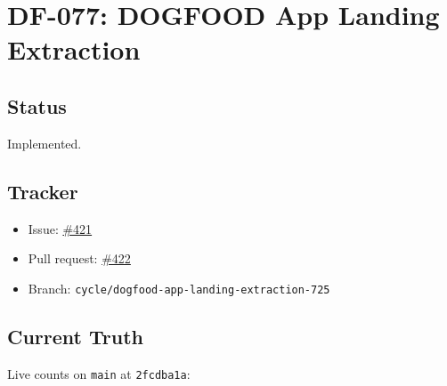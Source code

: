 \chapter{DF-077: DOGFOOD App Landing Extraction}\label{record-117}

\smallskip

\section{Status}\label{record-117-status}

Implemented.

\section{Tracker}\label{record-117-tracker}

\begin{itemize}
\tightlist
\item
  Issue: \href{https://github.com/flyingrobots/bijou/issues/421}{\#421}
\item
  Pull request: \href{https://github.com/flyingrobots/bijou/pull/422}{\#422}
\item
  Branch: \texttt{c\allowbreak{}y\allowbreak{}c\allowbreak{}l\allowbreak{}e\allowbreak{}/\allowbreak{}d\allowbreak{}o\allowbreak{}g\allowbreak{}f\allowbreak{}o\allowbreak{}o\allowbreak{}d\allowbreak{}-\allowbreak{}a\allowbreak{}p\allowbreak{}p\allowbreak{}-\allowbreak{}l\allowbreak{}a\allowbreak{}n\allowbreak{}d\allowbreak{}i\allowbreak{}n\allowbreak{}g\allowbreak{}-\allowbreak{}e\allowbreak{}x\allowbreak{}t\allowbreak{}r\allowbreak{}a\allowbreak{}c\allowbreak{}t\allowbreak{}i\allowbreak{}o\allowbreak{}n\allowbreak{}-\allowbreak{}7\allowbreak{}2\allowbreak{}5}
\end{itemize}

\section{Current Truth}\label{record-117-current-truth}

Live counts on \texttt{m\allowbreak{}a\allowbreak{}i\allowbreak{}n} at \texttt{2\allowbreak{}f\allowbreak{}c\allowbreak{}d\allowbreak{}b\allowbreak{}a\allowbreak{}1\allowbreak{}a}:

